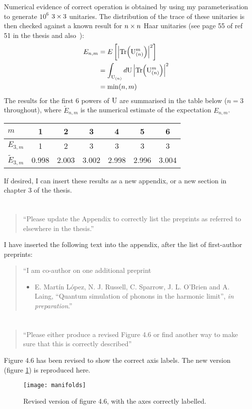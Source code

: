 \documentclass[a4paper,11pt]{article}
\begin{document}
Numerical evidence of correct operation is obtained by using my parameterisation
to generate \(10^{6}\) \(3 \times 3\) unitaries. The distribution of the trace of
these unitaries is then checked against a known result for \(n \times n\) Haar
unitaries (see page 55 of ref 51 in the thesis and also~\cite{diaconis}):
\begin{align}
    E_{n,m}
    &= E \left[ \left| \mathrm{Tr} \!\left( \mathrm{U}_{ \left(n\right) }^{m} \right) \right|^{2} \right] \\
    &= \int_{\mathrm{U}_{ \left(n\right) }} d \mathrm{U} \left| \mathrm{Tr} \!\left( \mathrm{U}_{
    \left(n\right) }^{m} \right) \right|^{2} \\
    &= \min \!\left(n,m\right)
\end{align}
The results for the first 6 powers of \( \mathrm{U} \) are summarised in the table
below (\(n=3\) throughout), where \(\widetilde{E}_{n,m}\) is the numerical
estimate of the expectation \(E_{n,m}\).

\def\arraystretch{1.3}
\begin{tabular}{l|c|c|c|c|c|c}
  \(m\) & 1 & 2 & 3 & 4 & 5 & 6 \\
  \hline
  \(E_{3,m}\) & 1 & 2 & 3 & 3 & 3 & 3 \\
  \hline
  \(\widetilde{E}_{3,m}\) & 0.998 & 2.003 & 3.002 & 2.998 & 2.996 & 3.004
\end{tabular}

If desired, I can insert these results as a new appendix, or a new section in
chapter 3 of the thesis.

\section{}
\begin{quote}
  ``Please update the Appendix to correctly list the preprints as
  referred to elsewhere in the thesis.''
\end{quote}
I have inserted the following text into the appendix, after the list of
first-author preprints:
\begin{quote}
  ``I am co-author on one additional preprint
  \begin{itemize}
    \item E. Mart\'in L\'opez, N. J. Russell, C. Sparrow, J. L. O'Brien and A.
      Laing, ``Quantum simulation of phonons in the harmonic limit'',
      \textit{in preparation}.''
  \end{itemize}
\end{quote}

\section{}
\begin{quote}
  ``Please either produce a revised Figure 4.6 or find another way to
  make sure that this is correctly described''
\end{quote}
Figure 4.6 has been revised to show the correct axis labels. The new version
(figure \ref{fig:manifolds}) is reproduced here.
\begin{figure}
  \centering
  \texttt{[image: manifolds]}
  \caption{Revised version of figure 4.6, with the axes correctly labelled.}
  \label{fig:manifolds}
\end{figure}
\end{document}
